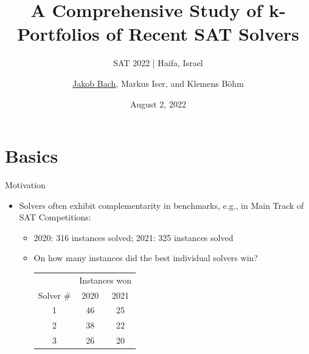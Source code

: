 \documentclass[en]{sdqbeamer}
\title[A Comprehensive Study of k-Portfolios of Recent SAT Solvers]{A Comprehensive Study of k-Portfolios of Recent SAT Solvers} %
\subtitle{SAT 2022 | Haifa, Israel}
\author[\underline{Jakob Bach}, Markus Iser, and Klemens Böhm]{\underline{Jakob Bach}, Markus Iser, and Klemens Böhm} %
\date[2022-08-02]{August 2, 2022} %
\begin{document}
\KITtitleframe

\section{Basics}

\begin{frame}[t]{Motivation}
	\begin{itemize}
		\pause
		\item Solvers often exhibit complementarity in benchmarks, e.g., in Main Track of SAT Competitions:
		\begin{itemize}
			\item 2020: 316 instances solved; 2021: 325 instances solved
			\pause
			\item On how many instances did the best individual solvers win? \\
			\vspace{\baselineskip}
			\begin{tabular}{ccc}
				\toprule
				& \multicolumn{2}{c}{Instances won} \\
				\cmidrule{2-3}
				Solver \# & 2020 & 2021 \\
				\midrule
				1 & 46 & 25 \\
				2 & 38 & 22 \\
				3 & 26 & 20 \\
				\bottomrule
			\end{tabular}

\end{itemize}
\end{itemize}
\end{frame}
\end{document}
